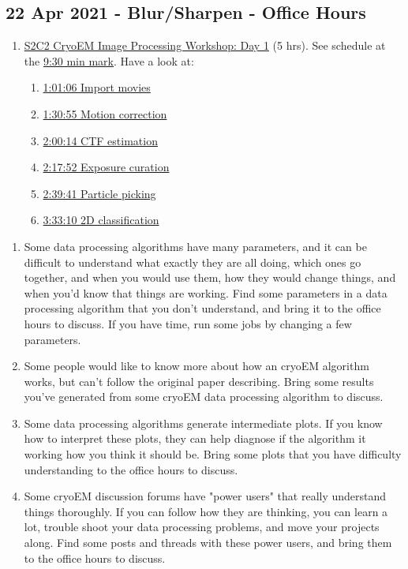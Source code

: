 \documentclass[11pt, oneside]{article}   	%
\begin{document}
\subsection{22 Apr 2021 - Blur/Sharpen - Office Hours }
\begin{enumerate}
	\item \href{https://youtu.be/eRPue0-Pkw4}{S2C2 CryoEM Image Processing Workshop: Day 1} (5 hrs). See schedule at the \href{https://youtu.be/eRPue0-Pkw4?t=570}{9:30 min mark}. Have a look at:
	\begin{enumerate}
		\item \href{https://www.youtube.com/watch?v=eRPue0-Pkw4&t=3666s}{1:01:06 Import movies}
		\item \href{https://www.youtube.com/watch?v=eRPue0-Pkw4&t=5455s}{1:30:55 Motion correction}
		\item \href{https://www.youtube.com/watch?v=eRPue0-Pkw4&t=7214s}{2:00:14 CTF estimation}
		\item \href{https://www.youtube.com/watch?v=eRPue0-Pkw4&t=8272s}{2:17:52 Exposure curation}
		\item \href{https://www.youtube.com/watch?v=eRPue0-Pkw4&t=9581s}{2:39:41 Particle picking}
		\item \href{https://www.youtube.com/watch?v=eRPue0-Pkw4&t=12790s}{3:33:10 2D classification}
	\end{enumerate}
\end{enumerate}
\begin{enumerate}
	\item Some data processing algorithms have many parameters, and it can be difficult to understand what exactly they are all doing, which ones go together, and when you would use them, how they would change things, and when you'd know that things are working. Find some parameters in a data processing algorithm that you don't understand, and bring it to the office hours to discuss. If you have time, run some jobs by changing a few parameters.
	\item Some people would like to know more about how an cryoEM algorithm works, but can't follow the original paper describing. Bring some results you've generated from some cryoEM data processing algorithm to discuss.
	\item Some data processing algorithms generate intermediate plots. If you know how to interpret these plots, they can help diagnose if the algorithm it working how you think it should be. Bring some plots that you have difficulty understanding to the office hours to discuss.  
	\item Some cryoEM discussion forums have "power users" that really understand things thoroughly. If you can follow how they are thinking, you can learn a lot, trouble shoot your data processing problems, and move your projects along. Find some posts and threads with these power users, and bring them to the office hours to discuss.
\end{enumerate}
\end{document}
